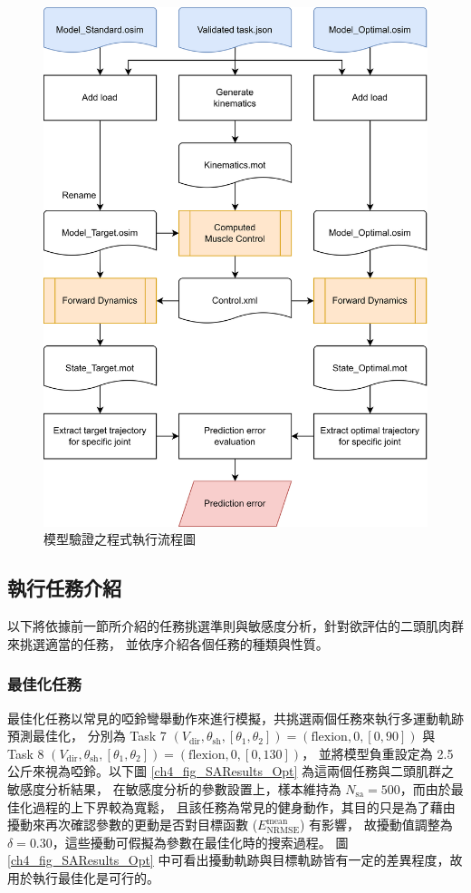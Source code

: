 \begin{figure}[!ht]
	\centering
	\includegraphics[width=11.5cm]{figure/ch4_flowchart_Vali.PNG}
    \caption[模型驗證之程式執行流程圖]{模型驗證之程式執行流程圖}
    \label{ch4_flowchart_Vali}
\end{figure}

\clearpage

\subsection{執行任務介紹}
以下將依據前一節所介紹的任務挑選準則與敏感度分析，針對欲評估的二頭肌肉群來挑選適當的任務，
並依序介紹各個任務的種類與性質。

\subsubsection{最佳化任務}
最佳化任務以常見的啞鈴彎舉動作來進行模擬，共挑選兩個任務來執行多運動軌跡預測最佳化，
分別為 Task 7 $(V_\mathrm{dir},\theta_\mathrm{sh},[\theta_1,\theta_2]) = (\text{flexion},0,[0,90])$
與 Task 8 $(V_\mathrm{dir},\theta_\mathrm{sh},[\theta_1,\theta_2]) = (\text{flexion},0,[0,130])$，
並將模型負重設定為 2.5 公斤來視為啞鈴。以下圖 \ref{ch4_fig_SAResults_Opt} 為這兩個任務與二頭肌群之敏感度分析結果，
在敏感度分析的參數設置上，樣本維持為 $N_\mathrm{sa} = 500$，而由於最佳化過程的上下界較為寬鬆，
且該任務為常見的健身動作，其目的只是為了藉由擾動來再次確認參數的更動是否對目標函數 ($E^\mathrm{mean}_\mathrm{NRMSE}$) 有影響，
故擾動值調整為 $\delta = 0.30$，這些擾動可假擬為參數在最佳化時的搜索過程。
圖 \ref{ch4_fig_SAResults_Opt} 中可看出擾動軌跡與目標軌跡皆有一定的差異程度，故用於執行最佳化是可行的。

